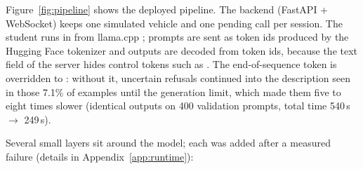 Figure~\ref{fig:pipeline} shows the deployed pipeline. The backend (FastAPI + WebSocket) keeps one simulated vehicle and one
pending call per session. The student runs in  from llama.cpp \citep{gerganov2023llamacpp}; prompts are
sent as token ids produced by the Hugging Face tokenizer and outputs are decoded from token ids, because the text field of
the server hides control tokens such as . The end-of-sequence token is overridden to : without it,
uncertain refusals continued into the description seen in those 7.1\% of examples until the generation limit, which made them five to eight times
slower (identical outputs on 400 validation prompts, total time 540\,s $\rightarrow$ 249\,s).

Several small layers sit around the model; each was added after a measured failure (details in Appendix~\ref{app:runtime}):

